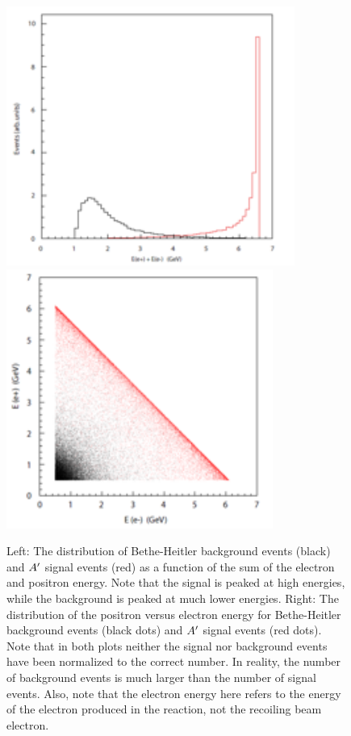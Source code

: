 \begin{figure}
\includegraphics[scale=1.4]{measurements/rad-bh-energy.pdf}
\includegraphics[scale=1.4]{measurements/E1vsE2.pdf}
\caption{ Left: The distribution of Bethe-Heitler background events (black) and $A^\prime$ signal events (red) as a function of the sum of the electron and positron energy. Note that the signal is peaked at high energies, while the background is peaked at much lower energies. Right: The distribution of the positron versus electron energy for Bethe-Heitler background events (black dots) and $A^\prime$ signal events (red dots). Note that in both plots neither the signal nor background events have been normalized to the correct number. In reality, the number of background events is much larger than the number of signal events. Also, note that the electron energy here refers to the energy of the electron produced in the reaction, not the recoiling beam electron.}
\label{fig:tridentkinematics}
\end{figure}




